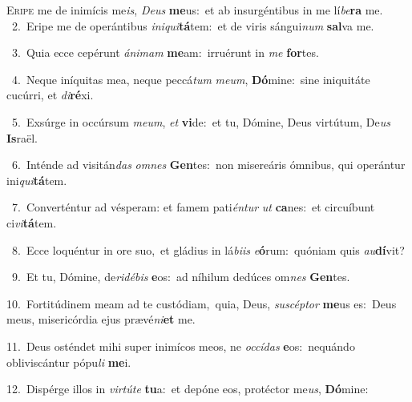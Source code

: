 \lettrine{\initial\textcolor{\initialcolor}{E}}{ripe} me de inimícis me\-\textit{is}\-, \textit{De}\-\textit{us} \textbf{me}\-us:~\star et ab insurgéntibus in me lí\-\textit{be}\-\textbf{ra} me.\\
{\numbfont\textcolor{\numbcolor}{~2.}}~Eripe me de operántibus \textit{in}\-\textit{i}\textit{qui}\textbf{tá}tem:~\star et de viris sángui\textit{num} \textbf{sal}\-va me.\par
{\numbfont\textcolor{\numbcolor}{~3.}}~Quia ecce cepérunt \textit{á}\-\textit{ni}\textit{mam} \textbf{me}\-am:~\star irruérunt in \textit{me} \textbf{for}\-tes.\par
{\numbfont\textcolor{\numbcolor}{~4.}}~Neque iníquitas mea, neque peccá\textit{tum} \textit{me}\-\textit{um}, \textbf{Dó}\-mine:~\star sine iniquitáte cucúrri, et \textit{di}\-\textbf{ré}xi.\par
{\numbfont\textcolor{\numbcolor}{~5.}}~Exsúrge in occúrsum \textit{me}\-\textit{um}, \textit{et} \textbf{vi}\-de:~\star et tu, Dómine, Deus virtútum, De\textit{us} \textbf{Is}\-raël.\par
{\numbfont\textcolor{\numbcolor}{~6.}}~Inténde ad visitán\textit{das} \textit{om}\-\textit{nes} \textbf{Gen}\-tes:~\star non misereáris ómnibus, qui operántur ini\-\textit{qui}\-\textbf{tá}tem.\par
{\numbfont\textcolor{\numbcolor}{~7.}}~Converténtur ad vésperam: et famem pati\-\textit{én}\-\textit{tur} \textit{ut} \textbf{ca}\-nes:~\star et circuíbunt ci\-\textit{vi}\-\textbf{tá}tem.\par
{\numbfont\textcolor{\numbcolor}{~8.}}~Ecce loquéntur in ore suo,~\dagger et gládius in lá\-\textit{bi}\-\textit{is} \textit{e}\-\textbf{ó}rum:~\star quóniam quis \textit{au}\-\textbf{dí}vit?\par
{\numbfont\textcolor{\numbcolor}{~9.}}~Et tu, Dómine, de\-\textit{ri}\-\textit{dé}\textit{bis} \textbf{e}\-os:~\star ad níhilum dedúces om\textit{nes} \textbf{Gen}\-tes.\par
{\numbfont\textcolor{\numbcolor}{10.}}~Fortitúdinem meam ad te custódiam,~\dagger quia, Deus, \textit{su}\-\textit{scép}\textit{tor} \textbf{me}\-us es:~\star Deus meus, misericórdia ejus prævé\-\textit{ni}\-\textbf{et} me.\par
{\numbfont\textcolor{\numbcolor}{11.}}~Deus osténdet mihi super inimícos meos, ne \textit{oc}\-\textit{cí}\textit{das} \textbf{e}\-os:~\star nequándo obliviscántur pópu\textit{li} \textbf{me}\-i.\par
{\numbfont\textcolor{\numbcolor}{12.}}~Dispérge illos in \textit{vir}\-\textit{tú}\textit{te} \textbf{tu}\-a:~\star et depóne eos, protéctor me\-\textit{us}\-, \textbf{Dó}\-mine:\par
